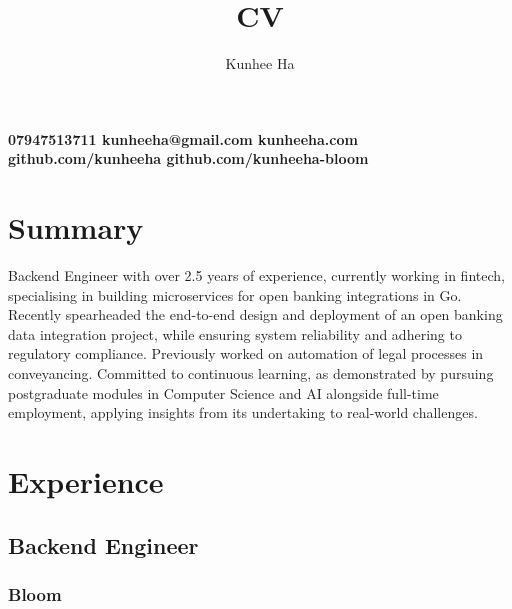 \documentclass{article}
\renewcommand{\maketitle}{
  {\noindent\rmfamily\Huge\bfseries\MakeUppercase\theauthor}
  \vspace{.8em}
  }
\newcommand{\contacts}[5]{
  {\noindent\rmfamily\small\color{BodyGrey}\bfseries
    {\color{LightGrey}\faPhone}\hspace{5pt}#1\hspace{12pt}      %
    {\color{LightGrey}\faEnvelope}\hspace{5pt}#2\hspace{12pt}   %
    {\color{LightGrey}\faLink}\hspace{5pt}#3\hspace{12pt}       %
    {\color{LightGrey}\faGithub}\hspace{5pt}#4\hspace{12pt}     %
    {\color{LightGrey}\faGithub}\hspace{5pt}#5                  %
  }
}
\begin{document}

  \title{CV}
  \author{Kunhee Ha}

  \maketitle

\contacts
  {07947513711}
  {kunheeha@gmail.com}
  {kunheeha.com}
  {github.com/kunheeha}
  {github.com/kunheeha-bloom}

\color{BodyGrey}
\section{Summary}
Backend Engineer with over 2.5 years of experience, currently working in fintech, specialising in building microservices for open banking integrations in Go. Recently spearheaded the end-to-end design and deployment of an open banking data integration project, while ensuring system reliability and adhering to regulatory compliance. Previously worked on automation of legal processes in conveyancing. Committed to continuous learning, as demonstrated by pursuing postgraduate modules in Computer Science and AI alongside full-time employment, applying insights from its undertaking to real-world challenges.
  \raggedright
  \vspace{3pt}
  \section{Experience}
  \subsection{Backend Engineer}
  \subsubsection{Bloom}
  {\color{LightGrey}\scriptsize\href{https://www.bloommoney.co}{\faExternalLink}}
  {\color{TitleGrey}{\small a fintech company that provides a digitised ROSCA as a service.}}
  \hspace*{\fill}{\color{TitleGrey}{\scriptsize\faCalendar}\hspace{5pt}{\small09/2023 -- Present}}
\end{document}
